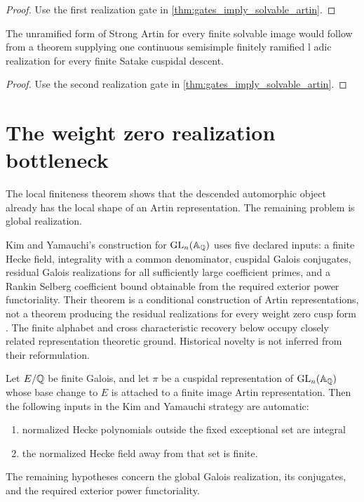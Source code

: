 \begin{proof}
Use the first realization gate in \cref{thm:gates_imply_solvable_artin}.
\end{proof}

\begin{corollary}\label{cor:single_ladic_target}
The unramified form of Strong Artin for every finite solvable image would follow from a theorem supplying one continuous semisimple finitely ramified l adic realization for every finite Satake cuspidal descent.
\end{corollary}

\begin{proof}
Use the second realization gate in \cref{thm:gates_imply_solvable_artin}.
\end{proof}

\section{The weight zero realization bottleneck}\label{sec:realization}

The local finiteness theorem shows that the descended automorphic object already has the local shape of an Artin representation. The remaining problem is global realization.

\begin{standardfact}\label{fact:kim_yamauchi}
Kim and Yamauchi's construction for \(\operatorname{GL}_n(\mathbb A_\mathbb Q)\) uses five declared inputs: a finite Hecke field, integrality with a common denominator, cuspidal Galois conjugates, residual Galois realizations for all sufficiently large coefficient primes, and a Rankin Selberg coefficient bound obtainable from the required exterior power functoriality. Their theorem is a conditional construction of Artin representations, not a theorem producing the residual realizations for every weight zero cusp form \cite{KimYamauchi2016}. The finite alphabet and cross characteristic recovery below occupy closely related representation theoretic ground. Historical novelty is not inferred from their reformulation.
\end{standardfact}

\begin{theorem}\label{thm:automatic_KY_inputs}
Let \(E/\mathbb Q\) be finite Galois, and let \(\pi\) be a cuspidal representation of \(\operatorname{GL}_n(\mathbb A_\mathbb Q)\) whose base change to \(E\) is attached to a finite image Artin representation. Then the following inputs in the Kim and Yamauchi strategy are automatic:

\begin{enumerate}
\item normalized Hecke polynomials outside the fixed exceptional set are integral
\item the normalized Hecke field away from that set is finite.
\end{enumerate}

The remaining hypotheses concern the global Galois realization, its conjugates, and the required exterior power functoriality.
\end{theorem}

